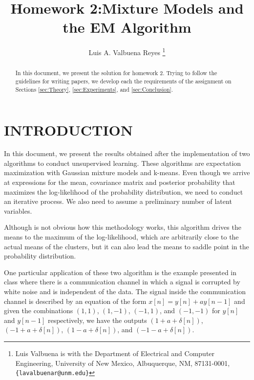 \documentclass[letterpaper, 10 pt, conference]{ieeeconf}  %
\title{\LARGE \bf
Homework 2:Mixture Models and the EM Algorithm
}
\author{Luis A. Valbuena Reyes%
\thanks{Luis Valbuena is with the Department of Electrical and Computer Engineering,
        University of New Mexico, Albuquerque, NM, 87131-0001, {\tt\small \{lavalbuenar@unm.edu\}}}%
}
\begin{document}
\newtheorem{theoremMyThesis}{Theorem}
\newtheorem{corollary}{Corollary}
\newtheorem{problemStatement}{Problem Statement}

\maketitle
\thispagestyle{empty}
\pagestyle{empty}


\begin{abstract}

In this document, we present the solution for homework 2. Trying to follow the guidelines for writing papers, we develop each the requirements of the assignment on Sections \ref{sec:Theory}, \ref{sec:Experiments}, and \ref{sec:Conclusion}.
\end{abstract}



\section{INTRODUCTION}
\label{sec:Intro}

In this document, we present the results obtained after the implementation of two algorithms to conduct unsupervised learning. These algorithms are expectation 
maximization with Gaussian mixture models and k-means. Even though we arrive at expressions for the mean, covariance matrix and posterior probability that maximizes the log-likelihood of the probability distribution, we need to conduct an iterative process. We also need to assume a preliminary number of latent variables.

Although is not obvious how this methodology works, this algorithm drives the means to the maximum of the log-likelihood, which are arbitrarily close to the actual
means of the clusters, but it can also lead the means to saddle point in the probability distribution.

One particular application of these two algorithm is the example presented in class where there is a communication channel in which a signal is corrupted by white noise and is independent of the data. The signal inside the communication channel is described by an equation of the form $x[n] = y[n] + ay[n - 1]$ and given the combinations $(1,1)$, $(1,-1)$, $(-1,1)$, and  $(-1,-1)$  for $y[n]$ and $y[n - 1]$ respectively, we have the outputs $(1 + a +\delta[n])$, $(-1 + a +\delta[n])$, $(1 - a +\delta[n])$, and  $(-1 - a +\delta[n])$.
\end{document}
